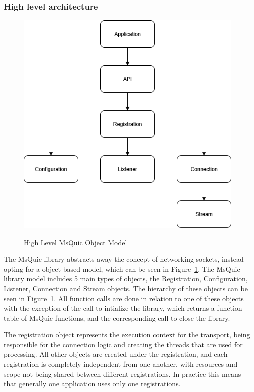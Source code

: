 \documentclass[english, 12pt, a4paper, elec, utf8, a-2b, online]{aaltothesis}
\begin{document}
\subsubsection{High level architecture}

\begin{figure}[h]
	\centering
	\includegraphics[alt={Block diagram of the high level object model of the MsQuic library, including relationships}, height=11cm]{./images/msquic_architecture.png}
	\caption{High Level MsQuic Object Model}
	\label{fig:msquic_arch}
\end{figure}

The MsQuic library abstracts away the concept of networking sockets, instead opting
for a object based model, which can be seen in Figure~\ref{fig:msquic_arch}. The
MsQuic library model includes 5 main types of objects, the Registration, Configuration,
Listener, Connection and Stream objects. The hierarchy of these objects can be seen
in Figure~\ref{fig:msquic_arch}. All function calls are done in relation to one of
these objects with the exception of the call to intialize the library, which returns
a function table of MsQuic functions, and the corresponding call to close the library\cite{msquic_docs}.

The registration object represents the execution context for the transport, being
responsible for the connection logic and creating the threads that are used for
processing. All other objects are created under the registration, and each registration
is completely independent from one another, with resources and scope not being
shared between different registrations. In practice this means that generally one
application uses only one registrations\cite{msquic_docs}.
\end{document}
